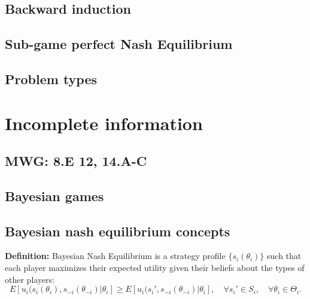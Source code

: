 \documentclass{article}
\begin{document}
\subsection{Backward induction}

\subsection{Sub-game perfect Nash Equilibrium}\label{spne}

\subsection{Problem types}


\section{Incomplete information}\label{II}
\subsection*{MWG: 8.E 12, 14.A-C}

\subsection{Bayesian games}\label{bayes}

\subsection{Bayesian nash equilibrium concepts}\label{WPBNE}

\textbf{Definition:} Bayesian Nash Equilibrium is a strategy profile \(\{s_i(\theta_i)\}\) such that each player maximizes their expected utility given their beliefs about the types of other players:
\[
E[u_i(s_i(\theta_i), s_{-i}(\theta_{-i}) | \theta_i] \geq E[u_i(s_i', s_{-i}(\theta_{-i}) | \theta_i], \quad \forall s_i' \in S_i, \quad \forall \theta_i \in \Theta_i.
\] \\
\end{document}
